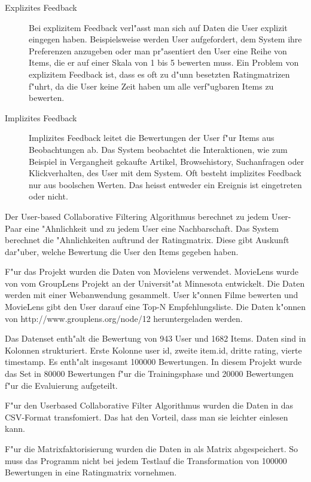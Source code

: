 \documentclass[a4paper, 12pt]{article}
\begin{document}
\begin{description}
\item[Explizites Feedback] Bei explizitem Feedback verl"asst man sich auf Daten die User explizit eingegen haben. Beispielsweise werden User aufgefordert, dem System ihre Preferenzen anzugeben oder man pr"asentiert den User eine Reihe von Items, die er auf einer Skala von 1 bis 5 bewerten muss. Ein Problem von explizitem Feedback ist, dass es oft zu d"unn besetzten Ratingmatrizen f"uhrt, da die User keine Zeit haben um alle verf"ugbaren Items zu bewerten.
\item[Implizites Feedback] Implizites Feedback leitet die Bewertungen der User f"ur Items aus Beobachtungen ab. Das System beobachtet die Interaktionen, wie zum Beispiel in Vergangheit gekaufte Artikel, Browsehistory, Suchanfragen oder Klickverhalten, des User mit dem System. Oft besteht implizites Feedback nur aus boolschen Werten. Das heisst entweder ein Ereignis ist eingetreten oder nicht.
\end{description}

 Der User-based Collaborative Filtering Algorithmus berechnet zu jedem User-Paar eine "Ahnlichkeit und zu jedem User eine Nachbarschaft. Das System berechnet die "Ahnlichkeiten auftrund der Ratingmatrix. Diese gibt Auskunft dar"uber, welche Bewertung die User den Items gegeben haben.

F"ur das Projekt wurden die Daten von Movielens verwendet. MovieLens wurde von vom GroupLens Projekt an der Universit"at Minnesota entwickelt. Die Daten werden mit einer Webanwendung gesammelt. User k"onnen Filme bewerten und MovieLens gibt den User darauf eine Top-N Empfehlungsliste. Die Daten k"onnen von http://www.grouplens.org/node/12 heruntergeladen werden. 

Das Datenset enth"alt die Bewertung von 943 User und 1682 Items.  Daten sind in Kolonnen strukturiert. Erste Kolonne user id, zweite item.id, dritte rating, vierte timestamp. Es enth"alt insgesamt 100000 Bewertungen. In diesem Projekt wurde das Set in 80000 Bewertungen f"ur die Trainingsphase und 20000 Bewertungen f"ur die Evaluierung aufgeteilt.

F"ur den Userbased Collaborative Filter Algorithmus wurden die Daten in das CSV-Format transfomiert. Das hat den Vorteil, dass man sie leichter einlesen kann.

F"ur die Matrixfaktorisierung wurden die Daten in als Matrix abgespeichert. So muss das Programm nicht bei jedem Testlauf die Transformation von 100000 Bewertungen in eine Ratingmatrix vornehmen.
\end{document}
